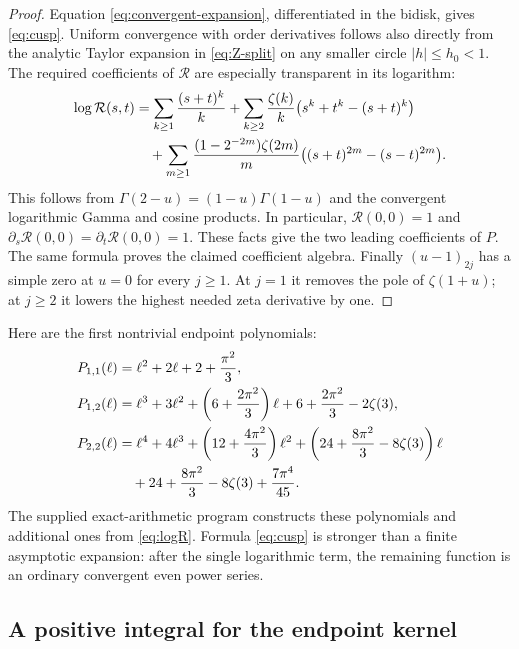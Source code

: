 \documentclass[11pt,a4paper]{article}
\numberwithin{equation}{section}
\theoremstyle{definition}
\theoremstyle{remark}
\begin{document}
\begin{proof}
Equation \eqref{eq:convergent-expansion}, differentiated in the bidisk,
gives \eqref{eq:cusp}. Uniform convergence with order derivatives follows
also directly from the analytic Taylor expansion in \eqref{eq:Z-split}
on any smaller circle $|h|\leq h_0<1$.
The required coefficients of $\mathcal R$ are especially transparent in
its logarithm:
\begin{align}
 \log\mathcal R(s,t)
 &=\sum_{k\geq1}\frac{(s+t)^k}{k}
   +\sum_{k\geq2}\frac{\zeta(k)}k
      \bigl(s^k+t^k-(s+t)^k\bigr)\notag\\
 &\quad+\sum_{m\geq1}\frac{(1-2^{-2m})\zeta(2m)}m
      \bigl((s+t)^{2m}-(s-t)^{2m}\bigr).
 \label{eq:logR}
\end{align}
This follows from $\Gamma(2-u)=(1-u)\Gamma(1-u)$ and the convergent
logarithmic Gamma and cosine products. In particular,
$\mathcal R(0,0)=1$ and $\partial_s\mathcal R(0,0)
=\partial_t\mathcal R(0,0)=1$. These facts give the two leading
coefficients of $P$. The same formula proves the claimed coefficient
algebra. Finally $(u-1)_{2j}$ has a simple zero at $u=0$ for every
$j\geq1$. At $j=1$ it removes the pole of $\zeta(1+u)$; at $j\geq2$
it lowers the highest needed zeta derivative by one.
\end{proof}

Here are the first nontrivial endpoint polynomials:
\begin{align}
 P_{1,1}(\ell)&=\ell^2+2\ell+2+\frac{\pi^2}{3},\label{eq:P11}\\
 P_{1,2}(\ell)&=\ell^3+3\ell^2+
       \left(6+\frac{2\pi^2}{3}\right)\ell
       +6+\frac{2\pi^2}{3}-2\zeta(3),\label{eq:P12}\\
 P_{2,2}(\ell)&=\ell^4+4\ell^3+
       \left(12+\frac{4\pi^2}{3}\right)\ell^2
       +\left(24+\frac{8\pi^2}{3}-8\zeta(3)\right)\ell\notag\\
 &\quad+24+\frac{8\pi^2}{3}-8\zeta(3)+\frac{7\pi^4}{45}.
 \label{eq:P22}
\end{align}
The supplied exact-arithmetic program constructs these polynomials and
additional ones from \eqref{eq:logR}. Formula \eqref{eq:cusp} is stronger
than a finite asymptotic expansion: after the single logarithmic term,
the remaining function is an ordinary convergent even power series.

\subsection{A positive integral for the endpoint kernel}
\end{document}
